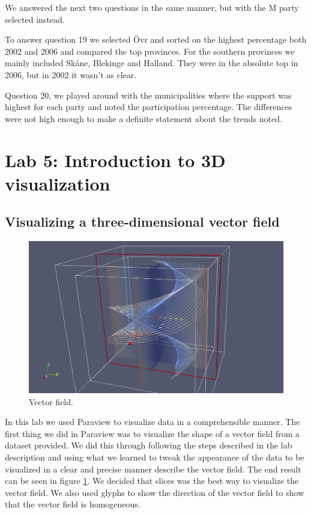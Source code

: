 \documentclass[a4paper]{article}
\begin{document}
We answered the next two questions in the same manner, but with the M party
selected instead.

To answer question 19 we selected \"Ovr and sorted on the highest percentage
both 2002 and 2006 and compared the top provinces. For the southern provinces we
mainly included Sk\aa ne, Blekinge and Halland. They were in the absolute top in
2006, but in 2002 it wasn't as clear.

Question 20, we played around with the municipalities where the support was
highest for each party and noted the participation percentage. The differences
were not high enough to make a definite statement about the trends noted.

\section{Lab 5: Introduction to 3D visualization}

\subsection{Visualizing a three-dimensional vector field}

\begin{figure}[H]
    \includegraphics[width=1\linewidth]{lab5/helix-screenshot.png}
    \caption{Vector field.}
    \label{fig:vectors}
\end{figure}

In this lab we used Paraview to visualize data in a comprehensible manner. The
first thing we did in Paraview was to visualize the shape of a vector field from
a dataset provided. We did this through following the steps described in the lab
description and using what we learned to tweak the appearance of the data to be
visualized in a clear and precise manner describe the vector field. The end
result can be seen in figure \ref{fig:vectors}. We decided that slices was the
best way to visualize the vector field. We also used glyphs to show the
direction of the vector field to show that the vector field is homogeneous.
\end{document}
